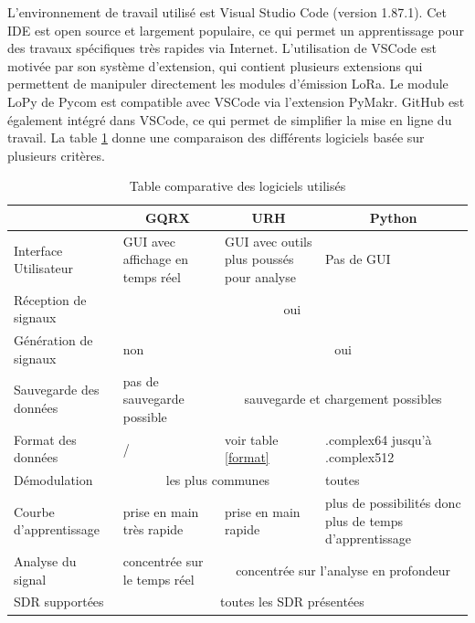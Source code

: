 \newpage

L'environnement de travail utilisé est Visual Studio Code (version 1.87.1). Cet \ac{IDE} est open source et largement populaire, ce qui permet un apprentissage pour des travaux spécifiques très rapides via Internet. L'utilisation de VSCode est motivée par son système d'extension, qui contient plusieurs extensions qui permettent de manipuler directement les modules d'émission \ac{LoRa}. Le module LoPy de Pycom est compatible avec VSCode via l'extension PyMakr. GitHub est également intégré dans VSCode, ce qui permet de simplifier la mise en ligne du travail. La table \ref{table2} donne une comparaison des différents logiciels basée sur plusieurs critères.

\begin{table}[h]
\centering
\begin{tabular}{|p{4cm}|p{2cm}|p{2cm}|p{3.5cm}|}
\hline
\multicolumn{1}{|c|}{} & \multicolumn{1}{c|}{GQRX} & \multicolumn{1}{c|}{URH} & \multicolumn{1}{c|}{Python}\\
\hline
Interface Utilisateur & GUI avec affichage en temps réel & GUI avec outils plus poussés pour analyse & Pas de GUI \\
\hline
Réception de signaux & \multicolumn{3}{c|}{oui} \\
\hline
Génération de signaux & non & \multicolumn{2}{c|}{oui} \\
\hline
Sauvegarde des données & pas de sauvegarde possible & \multicolumn{2}{c|}{sauvegarde et chargement possibles} \\
\hline
Format des données & / & voir table \ref{format} & .complex64 jusqu'à .complex512 \\
\hline
Démodulation &  \multicolumn{2}{c|}{les plus communes\footnotemark[12]}  & toutes\\
\hline
Courbe d'apprentissage & prise en main très rapide & prise en main rapide & plus de possibilités donc plus de temps d'apprentissage \\
\hline
Analyse du signal & concentrée sur le temps réel & \multicolumn{2}{c|}{concentrée sur l'analyse en profondeur} \\
\hline
SDR supportées & \multicolumn{3}{c|}{toutes les SDR présentées} \\
\hline
\end{tabular}
\caption{Table comparative des logiciels utilisés}
\label{table2}
\end{table}


